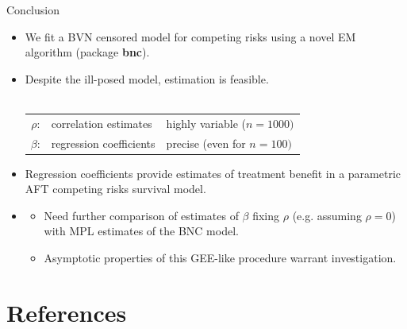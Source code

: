 \documentclass[10pt]{beamer}
\begin{document}
\begin{frame}{Conclusion}
  \begin{itemize}
  \item
    We fit a \alert{BVN censored model} for competing risks using a novel EM algorithm 
    (package \textbf{bnc}).
  \item
    Despite the \alert{ill-posed} model, estimation is feasible.\\
    {\color{DarkBlue}{Estimates:}} \\
   
    \begin{tabular}{ c l l }
    \hline
    $\rho$: &  \alert{correlation estimates} & highly variable ($n=1000)$ \\
    $\beta$: & \alert{regression coefficients}  &  precise (even for $n=100)$ \\ \hline  
    \end{tabular}
    
  \item Regression coefficients provide estimates of \alert{treatment benefit} 
  in a parametric \alert{AFT competing risks} survival model.
  \end{itemize}
  
  \begin{itemize}
  \item
    {\color{DarkBlue}{Outlook}}
    \begin{itemize}
    \item
      Need further comparison of estimates of $\beta$ fixing $\rho$ (e.g. assuming $\rho=0$) with MPL estimates of the BNC model.
    \item
      Asymptotic properties of this GEE-like procedure warrant investigation.
    \end{itemize}
  \end{itemize}
\end{frame}







\section*{References}\label{references}
\end{document}
